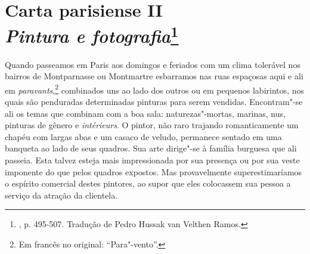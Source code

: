 \chapter{Carta parisiense II\\
\emph{Pintura e fotografia}\footnote[*]{
  , p. 495-507. Tradução de Pedro Hussak van Velthen Ramos.}}


Quando passeamos em Paris aos domingos e feriados com um clima tolerável
nos bairros de Montparnasse ou Montmartre esbarramos nas ruas espaçosas
aqui e ali em \emph{paravants},\footnote{Em francês no original:
  ``Para"-vento''. \versal{[N. T.]}} combinados uns ao lado dos outros ou em pequenos
labirintos, nos quais são penduradas determinadas pinturas para serem
vendidas. Encontram"-se ali os temas que combinam com a boa sala:
naturezas"-mortas, marinas, nus, pinturas de gênero e \emph{intérieurs}.
O pintor, não raro trajando romanticamente um chapéu com largas abas e
um casaco de veludo, permanece sentado em uma banqueta ao lado de seus
quadros. Sua arte dirige"-se à família burguesa que ali passeia. Esta
talvez esteja mais impressionada por sua presença ou por sua veste
imponente do que pelos quadros expostos. Mas provavelmente
superestimaríamos o espírito comercial destes pintores, ao supor que
eles colocassem sua pessoa a serviço da atração da clientela.

